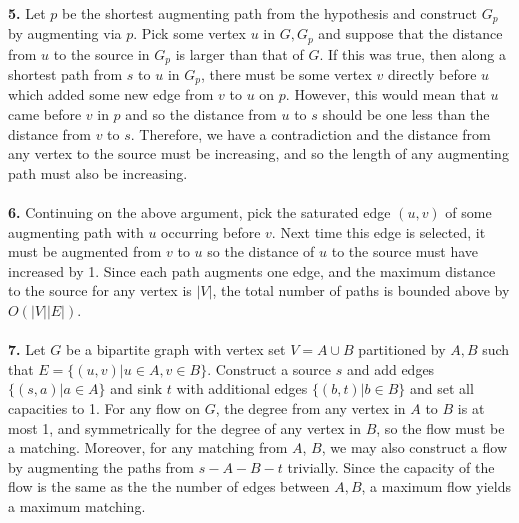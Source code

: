 \documentclass{article}
\begin{document}
\paragraph{} \textbf{5.}
Let $p$ be the shortest augmenting path from the hypothesis and construct $G_p$ by augmenting via $p$.  Pick some vertex $u$ in $G, G_p$ and suppose that the distance from $u$ to the source in $G_p$ is larger than that of $G$.  If this was true, then along a shortest path from $s$ to $u$ in $G_p$, there must be some vertex $v$ directly before $u$ which added some new edge from $v$ to $u$ on $p$.  However, this would mean that $u$ came before $v$ in $p$ and so the distance from $u$ to $s$ should be one less than the distance from $v$ to $s$.  Therefore, we have a contradiction and the distance from any vertex to the source must be increasing, and so the length of any augmenting path must also be increasing.

\paragraph{} \textbf{6.}
Continuing on the above argument, pick the saturated edge $(u,v)$ of some augmenting path with $u$ occurring before $v$.  Next time this edge is selected, it must be augmented from $v$ to $u$ so the distance of $u$ to the source must have increased by 1.  Since each path augments one edge, and the maximum distance to the source for any vertex is $|V|$, the total number of paths is bounded above by $O(|V| |E|)$.

\paragraph{} \textbf{7.}
Let $G$ be a bipartite graph with vertex set $V = A \cup B$ partitioned by $A,B$ such that $E = \{ (u, v) | u \in A, v \in B \}$.  Construct a source $s$ and add edges $\{ (s,a) | a \in A \}$ and sink $t$ with additional edges $\{ (b, t) | b \in B \}$ and set all capacities to 1.  For any flow on $G$, the degree from any vertex in $A$ to $B$ is at most 1, and symmetrically for the degree of any vertex in $B$, so the flow must be a matching.  Moreover, for any matching from $A$, $B$, we may also construct a flow by augmenting the paths from $s-A-B-t$ trivially.  Since the capacity of the flow is the same as the the number of edges between $A,B$, a maximum flow yields a maximum matching.
\end{document}
